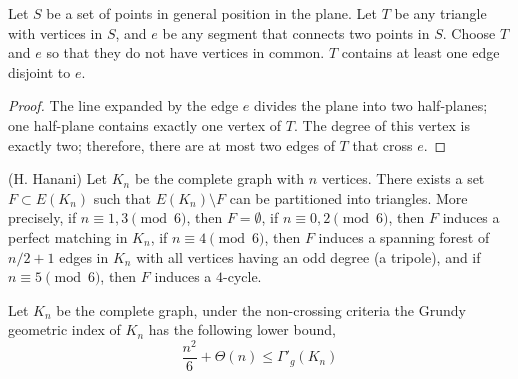 \documentclass[10pt,a4paper]{amsart}
\begin{document}
\begin{lemma}\label{lem:triangle-edge}
Let $S$ be a set of points in general position in the plane. Let $T$ be any triangle with vertices in $S$, and $e$ be any segment that connects two points in $S$. Choose $T$ and $e$ so that they do not have vertices in common. $T$ contains at least one edge disjoint to $e$.
\begin{proof}
    The line expanded by the edge $e$ divides the plane into two half-planes; one half-plane contains exactly one vertex of $T$. The degree of this vertex is exactly two; therefore, there are at most two edges of $T$ that cross $e$.
\end{proof}
\end{lemma}

\begin{theorem}(H. Hanani)\label{thm:partition}
    Let $K_n$ be the complete graph with $n$ vertices. There exists a set $F \subset E(K_n)$ such that $E(K_n) \setminus F$ can be partitioned into triangles. More precisely, if $n\equiv 1, 3 \pmod 6$, then $F = \emptyset$, if $n\equiv 0, 2 \pmod 6$, then $F$ induces a perfect matching in $K_n$, if $n\equiv 4 \pmod 6$, then $F$ induces a spanning forest of $n/2 + 1$ edges in $K_n$ with all vertices having an odd degree (a tripole), and if $n\equiv 5 \pmod 6$, then $F$ induces a $4$-cycle. 
\end{theorem}

\begin{theorem}\label{teo:remainder} 
Let $K_n$ be the complete graph, under the non-crossing criteria the Grundy geometric index of $K_n$ has the following lower bound,
\[\frac{n^2}{6}+\Theta(n)\leq \Gamma'_g(K_n)\]
\end{theorem}
\end{document}
